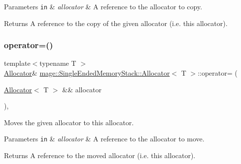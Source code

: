 \begin{DoxyParams}[1]{Parameters}
\mbox{\tt in}  & {\em allocator} & A reference to the allocator to copy. \\
\hline
\end{DoxyParams}
\begin{DoxyReturn}{Returns}
A reference to the copy of the given allocator (i.\+e. this allocator). 
\end{DoxyReturn}
\mbox{\label{classmage_1_1_single_ended_memory_stack_1_1_allocator_a0d5de467c96969b4c0d645bdc7b398db}} 
\subsubsection{\texorpdfstring{operator=()}{operator=()}\hspace{0.1cm}{\footnotesize\ttfamily [2/2]}}
{\footnotesize\ttfamily template$<$typename T $>$ \\
\mbox{\hyperlink{classmage_1_1_single_ended_memory_stack_1_1_allocator}{Allocator}}\& \mbox{\hyperlink{classmage_1_1_single_ended_memory_stack_1_1_allocator}{mage\+::\+Single\+Ended\+Memory\+Stack\+::\+Allocator}}$<$ T $>$\+::operator= (\begin{DoxyParamCaption}\item[{\mbox{\hyperlink{classmage_1_1_single_ended_memory_stack_1_1_allocator}{Allocator}}$<$ T $>$ \&\&}]{allocator }\end{DoxyParamCaption})\hspace{0.3cm}{\ttfamily [default]}, {\ttfamily [noexcept]}}

Moves the given allocator to this allocator.


\begin{DoxyParams}[1]{Parameters}
\mbox{\tt in}  & {\em allocator} & A reference to the allocator to move. \\
\hline
\end{DoxyParams}
\begin{DoxyReturn}{Returns}
A reference to the moved allocator (i.\+e. this allocator). 
\end{DoxyReturn}
\mbox{\label{classmage_1_1_single_ended_memory_stack_1_1_allocator_ac59d13195925c0b0bf536edd501708b8}} 
